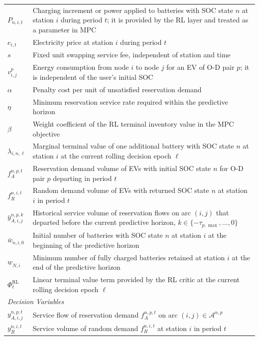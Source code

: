 \documentclass[12pt,hyperref,a4paper,UTF8]{ctexart}
\begin{document}
\begin{table}[!htbp]
\begin{tabular}{@{}lp{13cm}@{}}
    $P_{n,i,t}$ & Charging increment or power applied to batteries with SOC state $n$ at station $i$ during period $t$; it is provided by the RL layer and treated as a parameter in MPC \\
    $e_{i,t}$ & Electricity price at station $i$ during period $t$ \\
    $s$ & Fixed unit swapping service fee, independent of station and time \\
    $v^{p}_{i,j}$ & Energy consumption from node $i$ to node $j$ for an EV of O-D pair $p$; it is independent of the user's initial SOC \\
    $\alpha$ & Penalty cost per unit of unsatisfied reservation demand \\
    $\eta$ & Minimum reservation service rate required within the predictive horizon \\
    $\beta$ & Weight coefficient of the RL terminal inventory value in the MPC objective \\
    $\lambda_{i,n,\ell}$ & Marginal terminal value of one additional battery with SOC state $n$ at station $i$ at the current rolling decision epoch $\ell$ \\
    $f_{A}^{n,p,t}$ & Reservation demand volume of EVs with initial SOC state $n$ for O-D pair $p$ departing in period $t$ \\
    $f_{R}^{n,i,t}$ & Random demand volume of EVs with returned SOC state $n$ at station $i$ in period $t$ \\
    $\bar{y}_{A,i,j}^{n,p,k}$ & Historical service volume of reservation flows on arc $(i,j)$ that departed before the current predictive horizon, $k\in\{-\tau_{p,\max},\dots,0\}$ \\
    $\bar{w}_{n,i,0}$ & Initial number of batteries with SOC state $n$ at station $i$ at the beginning of the predictive horizon \\
    $\underline{w}_{N,i}$ & Minimum number of fully charged batteries retained at station $i$ at the end of the predictive horizon \\
    $\Phi^{\mathrm{RL}}_{\ell}$ & Linear terminal value term provided by the RL critic at the current rolling decision epoch $\ell$ \\
    \midrule
    \multicolumn{2}{l}{\textit{Decision Variables}} \\
    $y_{A,i,j}^{n,p,t}$ & Service flow of reservation demand $f_{A}^{n,p,t}$ on arc $(i,j)\in\mathcal{A}^{n,p}$ \\
    $y_{R}^{n,i,t}$ & Service volume of random demand $f_{R}^{n,i,t}$ at station $i$ in period $t$ \\

\end{tabular}
\end{table}
\end{document}
